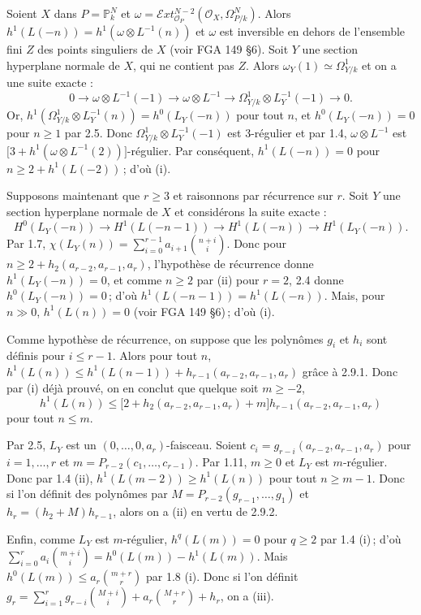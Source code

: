 Soient \(X\) dans \(P=\mathbb P_k^N\) et \(\omega=\mathcal E\!xt^{N-2}_{\mathcal O_P}(\mathcal O_X,\Omega^N_{P/k})\). Alors \(h^1(L(-n))=h^1(\omega\otimes L^{-1}(n))\) et \(\omega\) est inversible en dehors de l'ensemble fini \(Z\) des points singuliers de \(X\) (voir FGA 149 \S 6). Soit \(Y\) une section hyperplane normale de \(X\), qui ne contient pas \(Z\). Alors \(\omega_Y(1)\simeq\Omega^1_{Y/k}\) et on a une suite exacte :
\[
0\longrightarrow \omega\otimes L^{-1}(-1)
\longrightarrow \omega\otimes L^{-1}
\longrightarrow \Omega^1_{Y/k}\otimes L_Y^{-1}(-1)
\longrightarrow0.
\]
Or, \(h^1(\Omega^1_{Y/k}\otimes L_Y^{-1}(n))=h^0(L_Y(-n))\) pour tout \(n\), et \(h^0(L_Y(-n))=0\) pour \(n\ge1\) par 2.5. Donc \(\Omega^1_{Y/k}\otimes L_Y^{-1}(-1)\) est 3-régulier et par 1.4, \(\omega\otimes L^{-1}\) est \(\bigl[3+h^1(\omega\otimes L^{-1}(2))\bigr]\)-régulier. Par conséquent, \(h^1(L(-n))=0\) pour \(n\ge2+h^1(L(-2))\)\,; d'où (i).

Supposons maintenant que \(r\ge3\) et raisonnons par récurrence sur \(r\). Soit \(Y\) une section hyperplane normale de \(X\) et considérons la suite exacte :
\[
H^0(L_Y(-n))\longrightarrow H^1(L(-n-1))
\longrightarrow H^1(L(-n))\longrightarrow H^1(L_Y(-n)).
\tag{2.9.1}
\]
Par 1.7, \(\chi(L_Y(n))=\sum_{i=0}^{r-1}a_{i+1}\binom{n+i}{i}\). Donc pour \(n\ge2+h_2(a_{r-2},a_{r-1},a_r)\), l'hypothèse de récurrence donne \(h^1(L_Y(-n))=0\), et comme \(n\ge2\) par (ii) pour \(r=2\), 2.4 donne \(h^0(L_Y(-n))=0\)\,; d'où \(h^1(L(-n-1))=h^1(L(-n))\). Mais, pour \(n\gg0\), \(h^1(L(n))=0\) (voir FGA 149 \S 6)\,; d'où (i).

Comme hypothèse de récurrence, on suppose que les polynômes \(g_i\) et \(h_i\) sont définis pour \(i\le r-1\). Alors pour tout \(n\), \(h^1(L(n))\le h^1(L(n-1))+h_{r-1}(a_{r-2},a_{r-1},a_r)\) grâce à 2.9.1. Donc par (i) déjà
prouvé, on en conclut que quelque soit \(m\ge -2\),
\[
h^1(L(n))\le
\bigl[2+h_2(a_{r-2},a_{r-1},a_r)+m\bigr]
h_{r-1}(a_{r-2},a_{r-1},a_r)
\tag{2.9.2}
\]
pour tout \(n\le m\).

Par 2.5, \(L_Y\) est un \((0,\ldots,0,a_r)\)-faisceau. Soient \(c_i=g_{r-i}(a_{r-2},a_{r-1},a_r)\) pour \(i=1,\ldots,r\) et \(m=P_{r-2}(c_1,\ldots,c_{r-1})\). Par 1.11, \(m\ge0\) et \(L_Y\) est \(m\)-régulier. Donc par 1.4 (ii), \(h^1(L(m-2))\ge h^1(L(n))\) pour tout \(n\ge m-1\). Donc si l'on définit des polynômes par \(M=P_{r-2}(g_{r-1},\ldots,g_1)\) et \(h_r=(h_2+M)h_{r-1}\), alors on a (ii) en vertu de 2.9.2.

Enfin, comme \(L_Y\) est \(m\)-régulier, \(h^q(L(m))=0\) pour \(q\ge2\) par 1.4 (i)\,; d'où \(\sum_{i=0}^{r}a_i\binom{m+i}{i}=h^0(L(m))-h^1(L(m))\). Mais \(h^0(L(m))\le a_r\binom{m+r}{r}\) par 1.8 (i). Donc si l'on définit \(g_r=\sum_{i=1}^{r}g_{r-i}\binom{M+i}{i}+a_r\binom{M+r}{r}+h_r\), on a (iii).

